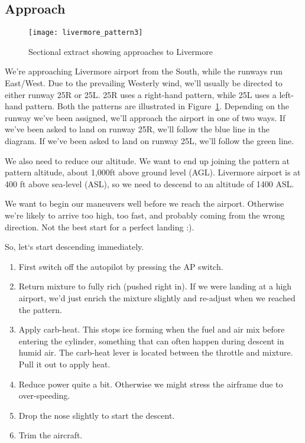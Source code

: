 \subsection{Approach}

\begin{figure}[!htp]
\centering
\texttt{[image: livermore\_pattern3]}
\caption{Sectional extract showing approaches to Livermore\label{approach}}
\end{figure}

We're approaching Livermore airport from the South, while the runways run East/West. Due to the prevailing Westerly wind, we'll usually be directed to either runway 25R or 25L. 25R uses a right-hand pattern, while 25L uses a left-hand pattern. Both the patterns are illustrated in Figure~\ref{approach}. Depending on the runway we've been assigned, we'll approach the airport in one of two ways. If we've been asked to land on runway 25R, we'll follow the blue line in the diagram. If we've been asked to land on runway 25L, we'll follow the green line. 

We also need to reduce our altitude. We want to end up joining the pattern at pattern altitude, about 1,000ft above ground level (AGL). Livermore airport is at 400 ft above sea-level (ASL), so we need to descend to an altitude of 1400 ASL.

We want to begin our maneuvers well before we reach the airport. Otherwise we're likely to arrive too high, too fast, and probably coming from the wrong direction. Not the best start for a perfect landing :).

So, let`s start descending immediately. 

\begin{enumerate}
\item First switch off the autopilot by pressing the AP switch. 

\item Return mixture to fully rich (pushed right in). If we were landing at a high airport, we'd just enrich the mixture slightly and re-adjust when we reached the pattern.

\item Apply carb-heat. This stops ice forming when the fuel and air mix before entering the cylinder, something that can often happen during descent in humid air. The carb-heat lever is located between the throttle and mixture. Pull it out to apply heat.

\item Reduce power quite a bit. Otherwise we might stress the airframe due to over-speeding.

\item Drop the nose slightly to start the descent.

\item Trim the aircraft.

\end{enumerate}

